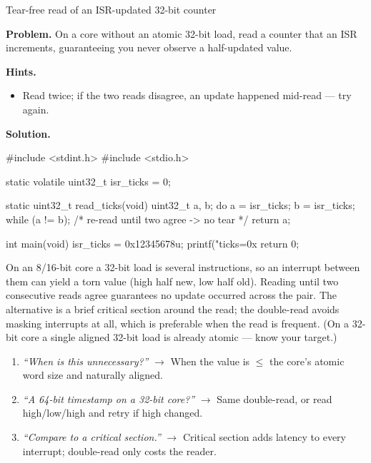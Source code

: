 \begin{gymproblem}{Tear-free read of an ISR-updated 32-bit counter}

\textbf{Problem.} On a core without an atomic 32-bit load, read a counter that
an ISR increments, guaranteeing you never observe a half-updated value.

\textbf{Hints.}
\begin{itemize}
\item Read twice; if the two reads disagree, an update happened mid-read --- try
  again.
\end{itemize}

\attempt

\textbf{Solution.}
\begin{cgym}
#include <stdint.h>
#include <stdio.h>

static volatile uint32_t isr_ticks = 0;

static uint32_t read_ticks(void) {
    uint32_t a, b;
    do {
        a = isr_ticks;
        b = isr_ticks;
    } while (a != b);     /* re-read until two agree -> no tear */
    return a;
}

int main(void) {
    isr_ticks = 0x12345678u;
    printf("ticks=0x%
    return 0;
}
\end{cgym}

On an 8/16-bit core a 32-bit load is several instructions, so an interrupt
between them can yield a torn value (high half new, low half old). Reading until
two consecutive reads agree guarantees no update occurred across the pair. The
alternative is a brief critical section around the read; the double-read avoids
masking interrupts at all, which is preferable when the read is frequent. (On a
32-bit core a single aligned 32-bit load is already atomic --- know your target.)

\followups
\begin{enumerate}
\item \emph{``When is this unnecessary?''} $\rightarrow$ When the value is
  $\le$ the core's atomic word size and naturally aligned.
\item \emph{``A 64-bit timestamp on a 32-bit core?''} $\rightarrow$ Same
  double-read, or read high/low/high and retry if high changed.
\item \emph{``Compare to a critical section.''} $\rightarrow$ Critical section
  adds latency to every interrupt; double-read only costs the reader.
\end{enumerate}
\end{gymproblem}

